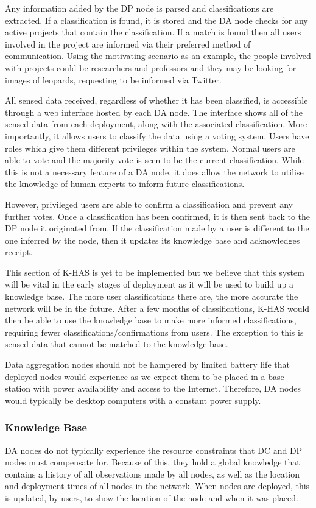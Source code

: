 	Any information added by the DP node is parsed and classifications are extracted. If a classification is found, it is stored and the DA node checks for any active projects that contain the classification. If a match is found then all users involved in the project are informed via their preferred method of communication. Using the motivating scenario as an example, the people involved with projects could be researchers and professors and they may be looking for images of leopards, requesting to be informed via Twitter.
	
	All sensed data received, regardless of whether it has been classified, is accessible through a web interface hosted by each DA node. The interface shows all of the sensed data from each deployment, along with the associated classification. More importantly, it allows users to classify the data using a voting system. Users have roles which give them different privileges within the system. Normal users are able to vote and the majority vote is seen to be the current classification. While this is not a necessary feature of a DA node, it does allow the network to utilise the knowledge of human experts to inform future classifications.
	
	However, privileged users are able to confirm a classification and prevent any further votes. Once a classification has been confirmed, it is then sent back to the DP node it originated from. If the classification made by a user is different to the one inferred by the node, then it updates its knowledge base and acknowledges receipt.

	This section of K-HAS is yet to be implemented but we believe that this system will be vital in the early stages of deployment as it will be used to build up a knowledge base. The more user classifications there are, the more accurate the network will be in the future. After a few months of classifications, K-HAS would then be able to use the knowledge base to make more informed classifications, requiring fewer classifications/confirmations from users. The exception to this is sensed data that cannot be matched to the knowledge base. 
	
	Data aggregation nodes should not be hampered by limited battery life that deployed nodes would experience as we expect them to be placed in a base station with power availability and access to the Internet. Therefore, DA nodes would typically be desktop computers with a constant power supply.
	
	\subsubsection{Knowledge Base}
	DA nodes do not typically experience the resource constraints that DC and DP nodes must compensate for. Because of this, they hold a global knowledge that contains a history of all observations made by all nodes, as well as the location and deployment times of all nodes in the network. When nodes are deployed, this is updated, by users, to show the location of the node and when it was placed. 

